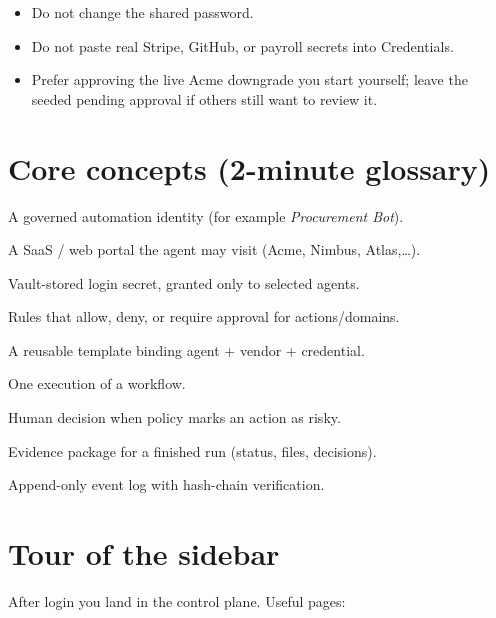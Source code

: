 \documentclass[11pt,a4paper]{article}
\begin{document}
\begin{warningbox}
  \begin{itemize}[leftmargin=1.1em,itemsep=0.2em]
    \item Do not change the shared password.
    \item Do not paste real Stripe, GitHub, or payroll secrets into Credentials.
    \item Prefer approving the live Acme downgrade you start yourself; leave the
          seeded pending approval if others still want to review it.
  \end{itemize}
\end{warningbox}

\section{Core concepts (2-minute glossary)}

\begin{description}[style=nextline,leftmargin=1.4em,font=\bfseries\color{aegisblue}]
  \item[Agent] A governed automation identity (for example \emph{Procurement Bot}).
  \item[Vendor] A SaaS / web portal the agent may visit (Acme, Nimbus, Atlas,\ldots).
  \item[Credential] Vault-stored login secret, granted only to selected agents.
  \item[Policy] Rules that allow, deny, or require approval for actions/domains.
  \item[Workflow] A reusable template binding agent + vendor + credential.
  \item[Run] One execution of a workflow.
  \item[Approval] Human decision when policy marks an action as risky.
  \item[Receipt] Evidence package for a finished run (status, files, decisions).
  \item[Audit] Append-only event log with hash-chain verification.
\end{description}

\section{Tour of the sidebar}

After login you land in the control plane. Useful pages:
\end{document}
